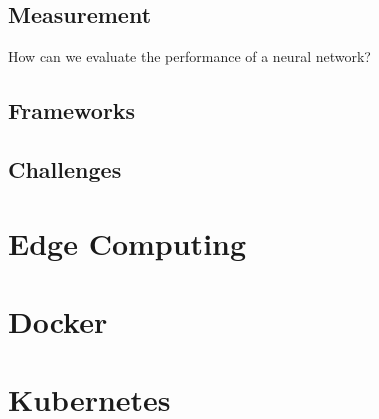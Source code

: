 \subsection{Measurement}
How can we evaluate the performance of a neural network?



\subsection{Frameworks}


\subsection{Challenges}


\section{Edge Computing}

\section{Docker}

\section{Kubernetes}


\clearpage
\thispagestyle{empty}